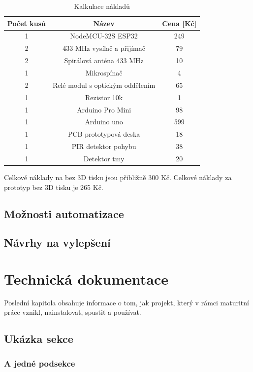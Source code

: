\documentclass[11pt,a4paper,twoside,openright]{report}
\begin{document}
\begin{table}[htb]
\centering
\begin{tabular}{|c|c|c|}
	\hline
	Počet kusů & Název & Cena [Kč] \\
	\hline
	1 & NodeMCU-32S ESP32 & 249  \\
	\hline
	2 & 433 MHz vysílač a přijímač & 79 \\
	\hline
	2 & Spirálová anténa 433 MHz & 10 \\
	\hline
	1 & Mikrospínač & 4 \\
	\hline
	2 & Relé modul s optickým oddělením & 65 \\
	\hline
	1 & Rezistor 10k & 1 \\
	\hline
	1 & Arduino Pro Mini & 98 \\
	\hline
	1 & Arduino uno & 599 \\
	\hline
	1 & PCB prototypová deska & 18 \\
	\hline
	1 & PIR detektor pohybu & 38 \\
	\hline
	1 & Detektor tmy & 20 \\
	\hline
\end{tabular}
\caption{Kalkulace nákladů}
\end{table}

Celkové náklady na  bez 3D tisku jsou přibližně 300 Kč.
Celkové náklady za prototyp  bez 3D tisku je 265 Kč.

\section{Možnosti automatizace}

\section{Návrhy na vylepšení}

\chapter{Technická dokumentace}

Poslední kapitola obsahuje informace o tom, jak projekt, který v rámci maturitní práce vznikl, nainstalovat, spustit a používat.

\section{Ukázka sekce}


\subsection{A jedné podsekce}
\end{document}
